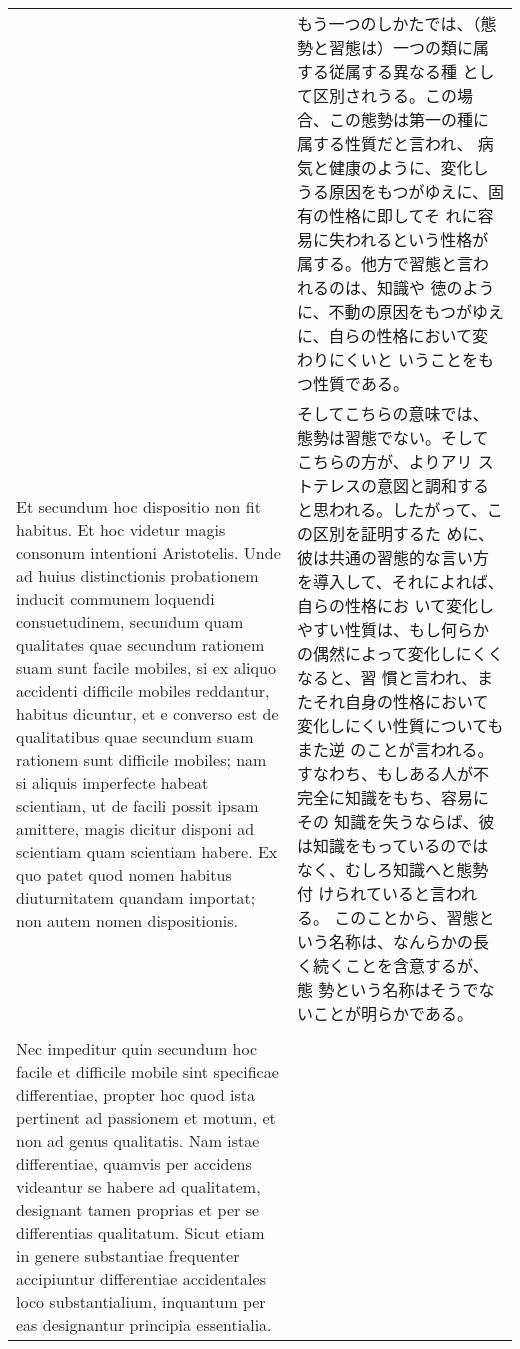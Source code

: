 \documentclass[10pt]{jsarticle} %
\begin{document}
\begin{longtable}{p{21em}p{21em}}
&

もう一つのしかたでは、（態勢と習態は）一つの類に属する従属する異なる種
として区別されうる。この場合、この態勢は第一の種に属する性質だと言われ、
病気と健康のように、変化しうる原因をもつがゆえに、固有の性格に即してそ
れに容易に失われるという性格が属する。他方で習態と言われるのは、知識や
徳のように、不動の原因をもつがゆえに、自らの性格において変わりにくいと
いうことをもつ性質である。

\\


Et secundum hoc dispositio non fit habitus. Et hoc videtur
magis consonum intentioni Aristotelis. Unde ad huius distinctionis
probationem inducit communem loquendi consuetudinem, secundum quam
qualitates quae secundum rationem suam sunt facile mobiles, si ex
aliquo accidenti difficile mobiles reddantur, habitus dicuntur, et e
converso est de qualitatibus quae secundum suam rationem sunt
difficile mobiles; nam si aliquis imperfecte habeat scientiam, ut de
facili possit ipsam amittere, magis dicitur disponi ad scientiam quam
scientiam habere. 
Ex quo patet quod nomen habitus diuturnitatem
quandam importat; non autem nomen dispositionis. 


&

そしてこちらの意味では、態勢は習態でない。そしてこちらの方が、よりアリ
ストテレスの意図と調和すると思われる。したがって、この区別を証明するた
めに、彼は共通の習態的な言い方を導入して、それによれば、自らの性格にお
いて変化しやすい性質は、もし何らかの偶然によって変化しにくくなると、習
慣と言われ、またそれ自身の性格において変化しにくい性質についてもまた逆
のことが言われる。すなわち、もしある人が不完全に知識をもち、容易にその
知識を失うならば、彼は知識をもっているのではなく、むしろ知識へと態勢付
けられていると言われる。
このことから、習態という名称は、なんらかの長く続くことを含意するが、態
勢という名称はそうでないことが明らかである。

\\




&


\\

Nec impeditur quin
secundum hoc facile et difficile mobile sint specificae differentiae,
propter hoc quod ista pertinent ad passionem et motum, et non ad genus
qualitatis. 
Nam istae differentiae, quamvis per accidens videantur se
habere ad qualitatem, designant tamen proprias et per se differentias
qualitatum. Sicut etiam in genere substantiae frequenter accipiuntur
differentiae accidentales loco substantialium, inquantum per eas
designantur principia essentialia.


\end{longtable}
\end{document}
